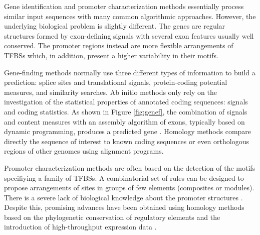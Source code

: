
\label{sec:methods}

Gene identification and promoter characterization methods essentially process similar
input sequences with many common algorithmic approaches. However, the underlying biological 
problem is slightly different. The genes are regular structures formed by exon-defining signals
with several exon features usually well conserved. The promoter regions instead are more flexible 
arrangements of TFBSs which, in addition, present a higher variability in their motifs. 

Gene-finding  
methods normally use three different types of information to build a prediction: 
splice sites and translational signals, protein-coding potential measures, and similarity searches.
Ab initio methods only rely on the investigation of the statistical properties of annotated coding
sequences: signals and coding statistics. As shown in Figure \ref{fig:genef}, the combination of signals and 
content measures with an assembly algorithm of exons, typically based on dynamic programming, produces 
a predicted gene \citep{haussler:1998a,stormo:2000a}. Homology methods compare directly the 
sequence of interest to known coding sequences or even orthologous regions of other genomes using 
alignment programs. 

Promoter characterization 
methods are often based on the detection of the motifs specifiying
a family of TFBSs. A combinatorial set of rules can be designed to propose arrangements of sites in groups
of few elements (composites or modules). There is a severe lack of biological knowledge about the 
promoter structures \citep{fickett:1997a,fickett:2000a}. Despite this, promising
advances have been obtained using homology methods based on the phylogenetic conservation of 
regulatory elements and the introduction of high-throughput expression data \citep{blanco:2005a}.

